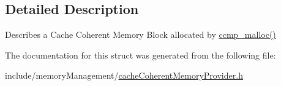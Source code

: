 \subsection{Detailed Description}
Describes a Cache Coherent Memory Block allocated by \hyperlink{cacheCoherentMemoryProvider_8c_a72b3227fd1265a06a6b65e36b4c370ee}{ccmp\+\_\+malloc()} 

The documentation for this struct was generated from the following file\+:\begin{DoxyCompactItemize}
\item 
include/memory\+Management/\hyperlink{cacheCoherentMemoryProvider_8h}{cache\+Coherent\+Memory\+Provider.\+h}\end{DoxyCompactItemize}
